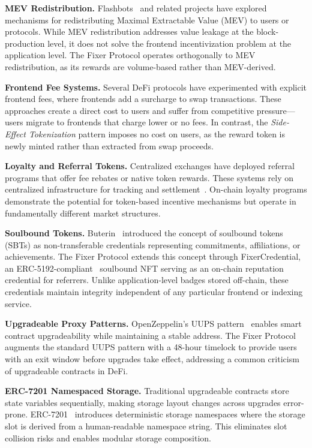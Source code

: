 \documentclass[conference]{IEEEtran}
\begin{document}
\textbf{MEV Redistribution.} Flashbots~\cite{flashbots} and related projects have explored mechanisms for redistributing Maximal Extractable Value (MEV) to users or protocols. While MEV redistribution addresses value leakage at the block-production level, it does not solve the frontend incentivization problem at the application level. The Fixer Protocol operates orthogonally to MEV redistribution, as its rewards are volume-based rather than MEV-derived.

\textbf{Frontend Fee Systems.} Several DeFi protocols have experimented with explicit frontend fees, where frontends add a surcharge to swap transactions. These approaches create a direct cost to users and suffer from competitive pressure---users migrate to frontends that charge lower or no fees. In contrast, the \textit{Side-Effect Tokenization} pattern imposes no cost on users, as the reward token is newly minted rather than extracted from swap proceeds.

\textbf{Loyalty and Referral Tokens.} Centralized exchanges have deployed referral programs that offer fee rebates or native token rewards. These systems rely on centralized infrastructure for tracking and settlement~\cite{flashboys}. On-chain loyalty programs demonstrate the potential for token-based incentive mechanisms but operate in fundamentally different market structures.

\textbf{Soulbound Tokens.} Buterin~\cite{soulbound} introduced the concept of soulbound tokens (SBTs) as non-transferable credentials representing commitments, affiliations, or achievements. The Fixer Protocol extends this concept through FixerCredential, an ERC-5192-compliant~\cite{erc5192} soulbound NFT serving as an on-chain reputation credential for referrers. Unlike application-level badges stored off-chain, these credentials maintain integrity independent of any particular frontend or indexing service.

\textbf{Upgradeable Proxy Patterns.} OpenZeppelin's UUPS pattern~\cite{openzeppelin} enables smart contract upgradeability while maintaining a stable address. The Fixer Protocol augments the standard UUPS pattern with a 48-hour timelock to provide users with an exit window before upgrades take effect, addressing a common criticism of upgradeable contracts in DeFi.

\textbf{ERC-7201 Namespaced Storage.} Traditional upgradeable contracts store state variables sequentially, making storage layout changes across upgrades error-prone. ERC-7201~\cite{erc7201} introduces deterministic storage namespaces where the storage slot is derived from a human-readable namespace string. This eliminates slot collision risks and enables modular storage composition.
\end{document}
